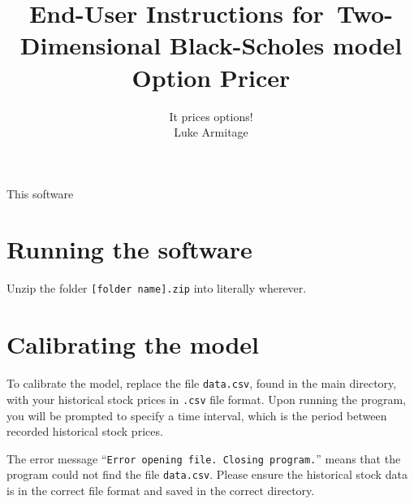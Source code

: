 \documentclass[12pt,a4paper]{article}
\author{It prices options! \\ Luke Armitage}\date{}
\title{{\bfseries End-User Instructions} for~Two-Dimensional Black-Scholes model Option Pricer}
\begin{document}
\maketitle
This software 


\section{Running the software}
Unzip the folder \texttt{[folder name].zip} into literally wherever.


\section{Calibrating the model}
To calibrate the model, replace the file \texttt{data.csv}, found in the main directory, with your historical stock prices in \texttt{.csv} file format. Upon running the program, you will be prompted to specify a time interval, which is the period between recorded historical stock prices. 

The error message ``\texttt{Error opening file. Closing program.}'' means that the program could not find the file \texttt{data.csv}. Please ensure the historical stock data is in the correct file format and saved in the correct directory.
\end{document}
